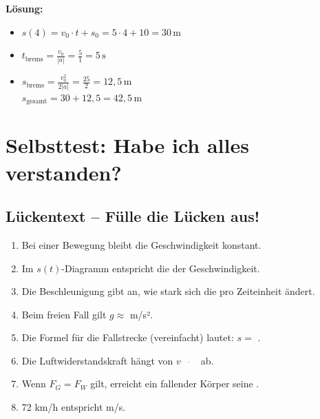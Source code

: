 \documentclass[11pt,a4paper]{article}
\begin{document}
\textbf{Lösung:}
\begin{itemize}
\item[a)] $s(4) = v_0 \cdot t + s_0 = 5 \cdot 4 + 10 = 30\,\mathrm{m}$
\item[b)] $t_{\text{brems}} = \frac{v_0}{|a|} = \frac{5}{1} = 5\,\mathrm{s}$
\item[c)] $s_{\text{brems}} = \frac{v_0^2}{2|a|} = \frac{25}{2} = 12{,}5\,\mathrm{m}$\\
$s_{\text{gesamt}} = 30 + 12{,}5 = 42{,}5\,\mathrm{m}$
\end{itemize}

\newpage
\section{Selbsttest: Habe ich alles verstanden?}

\subsection{Lückentext -- Fülle die Lücken aus!}

\begin{tcolorbox}[colback=lightgray, colframe=gray, boxrule=0.5pt]
\begin{enumerate}[itemsep=8pt]
\item Bei einer \underline{\hspace{3cm}} Bewegung bleibt die Geschwindigkeit konstant.

\item Im $s(t)$-Diagramm entspricht die \underline{\hspace{3cm}} der Geschwindigkeit.

\item Die Beschleunigung gibt an, wie stark sich die \underline{\hspace{3cm}} pro Zeiteinheit ändert.

\item Beim freien Fall gilt $g \approx$ \underline{\hspace{2cm}} m/s².

\item Die Formel für die Fallstrecke (vereinfacht) lautet: $s = $ \underline{\hspace{2cm}}.

\item Die Luftwiderstandskraft hängt von $v^{\underline{\hspace{1cm}}}$ ab.

\item Wenn $F_G = F_W$ gilt, erreicht ein fallender Körper seine \underline{\hspace{3cm}}.

\item 72 km/h entspricht \underline{\hspace{2cm}} m/s.
\end{enumerate}
\end{tcolorbox}
\end{document}
